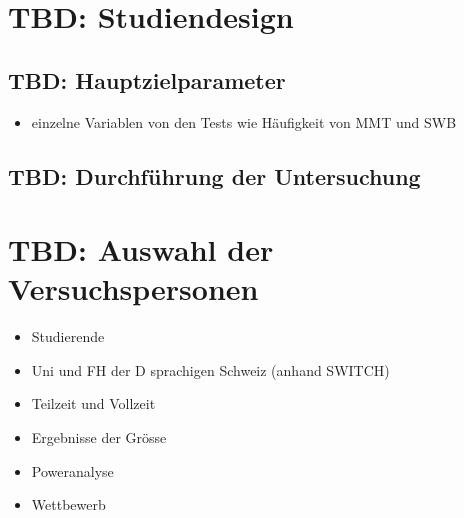 %
%
\glsresetall
\let\raggedsection\centering 
{}
\let\raggedsection\raggedright 

\section{TBD: Studiendesign}\label{section.studiendesign}
\subsection{TBD: Hauptzielparameter}\label{subsection.hauptzielparameter}
\begin{itemize}
    \item einzelne Variablen von den Tests wie Häufigkeit von MMT und SWB
\end{itemize}

\subsection{TBD: Durchführung der Untersuchung}\label{subsection.durchführung}

\section{TBD: Auswahl der Versuchspersonen}\label{section.auswahlVersuchsp}
\begin{itemize}
      \item Studierende
      \item Uni und FH der D sprachigen Schweiz (anhand SWITCH)
      \item Teilzeit und Vollzeit
      \item Ergebnisse der Grösse
      \item Poweranalyse
      \item Wettbewerb
\end{itemize}

